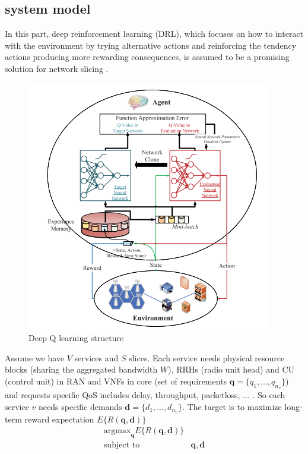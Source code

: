 \documentclass{article}
\begin{document}
\subsection{system model}
In this part, deep reinforcement learning (DRL), which focuses on how to interact with the environment by
trying alternative actions and reinforcing the tendency actions producing more rewarding consequences,
is assumed to be a promising solution for network slicing \cite{drl}.
\begin{figure}%
  \centering
    \includegraphics[width=\linewidth]{drl}
  \caption{Deep Q learning structure}
  \label{fig:drl}
\end{figure}
Assume we have $V$ services and $S$ slices. Each service needs physical resource blocks (sharing the aggregated bandwidth $W$), RRHs (radio unit head) and CU (control unit) in RAN and VNFs in core (set of requirements $\mathbf{q} = \{q_1, ..., q_{n_v}\}$) and requests specific QoS includes delay, throughput, packetloss, ... . 
So each service $v$ needs specific demands $\mathbf{d} = \{d_1, ..., d_{n_v}\}$.
The target is to maximize long-term reward expectation $E\{R(\mathbf{q},\mathbf{d})\}$
\begin{subequations}
\begin{alignat}{4}
\text{argmax}_{\mathbf{q}} E\{R(\mathbf{q},\mathbf{d})\} \\
\text{subject to} \quad  & \mathbf{q} , \mathbf{d}  
\end{alignat}
\label{constraints1}
\end{subequations}
\end{document}
